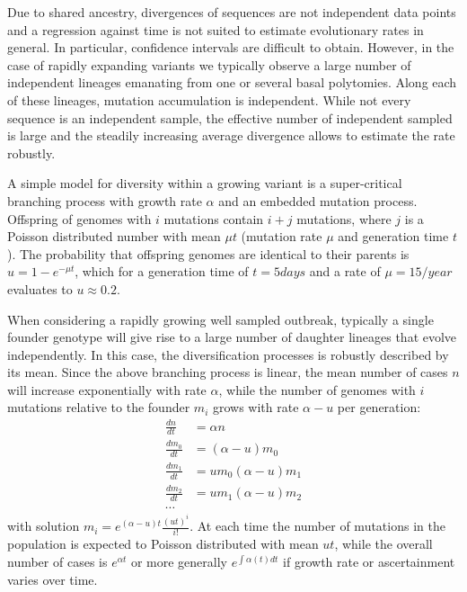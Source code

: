 \documentclass[aps,rmp, twocolumn]{revtex4}
\begin{document}
Due to shared ancestry, divergences of sequences are not independent data points and a regression against time is not suited to estimate evolutionary rates in general.
In particular, confidence intervals are difficult to obtain.
However, in the case of rapidly expanding variants we typically observe a large number of independent lineages emanating from one or several basal polytomies.
Along each of these lineages, mutation accumulation is independent.
While not every sequence is an independent sample, the effective number of independent sampled is large and the steadily increasing average divergence allows to estimate the rate robustly.

A simple model for diversity within a growing variant is a super-critical branching process with growth rate $\alpha$ and an embedded mutation process.
Offspring of genomes with $i$ mutations contain $i+j$ mutations, where $j$ is a Poisson distributed number with mean $\mu t$ (mutation rate $\mu$ and generation time $t$).
The probability that offspring genomes are identical to their parents is $u = 1-e^{-\mu t}$, which for a generation time of $t=5days$ and a rate of $\mu = 15/year$ evaluates to $u\approx 0.2$.

When considering a rapidly growing well sampled outbreak, typically a single founder genotype will give rise to a large number of daughter lineages that evolve independently.
In this case, the diversification processes is robustly described by its mean.
Since the above branching process is linear, the mean number of cases $n$ will increase exponentially with rate $\alpha$, while the number of genomes with $i$ mutations relative to the founder $m_i$ grows with rate $\alpha - u$ per generation:
\begin{equation}
    \begin{split}
        \frac{dn}{dt} &= \alpha n \\
        \frac{dm_0}{dt} &= (\alpha - u) m_0 \\
        \frac{dm_1}{dt} &= u m_0 (\alpha - u) m_1 \\
        \frac{dm_2}{dt} &= u m_1 (\alpha - u) m_2 \\
        \cdots
    \end{split}
\end{equation}
with solution $m_i = e^{(\alpha - u)t} \frac{(ut)^i}{i!}$.
At each time the number of mutations in the population is expected to Poisson distributed with mean $ut$, while the overall number of cases is $e^{\alpha t}$ or more generally $e^{\int \alpha(t) dt}$ if growth rate or ascertainment varies over time.
\end{document}
